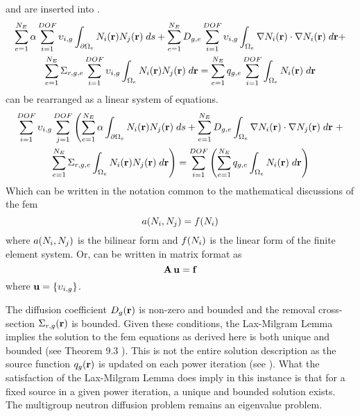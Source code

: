      and  are inserted 
    into .
    \begin{multline}
      \label{eq:this_above}
      \sum_{e=1}^{N_E} \alpha \sum_{i=1}^{DOF} \upsilon_{i,g}
        \int_{\partial \Omega_e}
        N_i(\mathbf{r})  N_j(\mathbf{r}) \;ds +
        \sum_{e=1}^{N_E} D_{g,e} \sum_{i=1}^{DOF} \upsilon_{i,g}
        \int_{\Omega_e} \mathbf{\nabla} N_i(\mathbf{r}) \cdot \mathbf{\nabla} N_i(\mathbf{r})\;d\mathbf{r}
        + \\
        \sum_{e=1}^{N_E} \Sigma_{r,g,e} \sum_{i=1}^{DOF} \upsilon_{i,g}
        \int_{\Omega_e} N_i(\mathbf{r}) N_j(\mathbf{r}) \; d\mathbf{r} =
        \sum_{e=1}^{N_E} q_{g,e} \sum_{i=1}^{DOF} 
        \int_{\Omega_e} N_i(\mathbf{r}) \; d\mathbf{r}
    \end{multline}
     can be rearranged as a linear system of equations.
    \begin{multline}
      \label{eq:linear_equation}
      \sum_{i=1}^{DOF} \upsilon_{i,g} \sum_{j=1}^{DOF} \left(
        \sum_{e=1}^{N_E} \alpha \int_{\partial \Omega_e}
        N_i(\mathbf{r})  N_j(\mathbf{r}) \;ds +
        \sum_{e=1}^{N_E} D_{g,e} 
        \int_{\Omega_e} \mathbf{\nabla} N_i(\mathbf{r}) \cdot \mathbf{\nabla} N_j(\mathbf{r})\;d\mathbf{r}
        \right.
        + \\
        \left.
        \sum_{e=1}^{N_E} \Sigma_{r,g,e}
        \int_{\Omega_e} N_i(\mathbf{r}) N_j(\mathbf{r}) \; d\mathbf{r} \right) =
        \sum_{i=1}^{DOF} \left(
        \sum_{e=1}^{N_E} q_{g,e} 
        \int_{\Omega_e} N_i(\mathbf{r}) \; d\mathbf{r} \right)
    \end{multline}
    Which can be written in the notation common to the mathematical discussions 
    of the \gls{fem}
    \begin{equation}
      \label{eq:fem_notation}
      a(N_i,N_j) = f(N_i)
    \end{equation}
    where $a(N_i,N_j)$ is the bilinear form and $f(N_i)$ is the 
    linear form of the finite element system.
    Or,  can be written in matrix format as
    \begin{equation}
      \label{eq:matrix_notation}
      \mathbf{A} \, \mathbf{u} = \mathbf{f}
    \end{equation}
    where $\mathbf{u} = \{\upsilon_{i,g}\}$. 
    
    The diffusion coefficient $D_g(\mathbf{r})$ is non-zero and bounded and
    the removal cross-section $\Sigma_{r,g}(\mathbf{r})$ is bounded. Given these
    conditions, the Lax-Milgram Lemma implies the solution to the \gls{fem}
    equations as derived here is both unique and bounded (see Theorem 9.3 
    \cite{textbookli}). This is not the entire solution description as the 
    source function $q_g(\mathbf{r})$ is updated on each power iteration (see 
    ). What the satisfaction of the Lax-Milgram Lemma
    does imply in this instance is that for a fixed source in a given power 
    iteration, a unique and bounded solution exists. The multigroup neutron 
    diffusion problem remains an eigenvalue problem.
    
